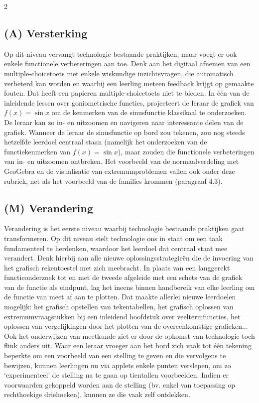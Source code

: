\begin{multicols}{2}
\subsection*{(A) Versterking}
Op dit niveau vervangt technologie bestaande praktijken, maar voegt er ook enkele functionele verbeteringen aan toe. Denk aan het digitaal afnemen van een multiple-choicetoets met enkele wiskundige inzichtsvragen, die automatisch verbeterd kan worden en waarbij een leerling meteen feedback krijgt op gemaakte fouten. Dat heeft een papieren multiple-choicetoets niet te bieden. In één van de inleidende lessen over goniometrische functies, projecteert de leraar de grafiek van $f(x)=\sin x$ om de kenmerken van de sinusfunctie klassikaal te onderzoeken. De leraar kan zo in- en uitzoomen en navigeren naar interessante delen van de grafiek. Wanneer de leraar de sinusfunctie op bord zou tekenen, zou nog steeds hetzelfde leerdoel centraal staan (namelijk het onderzoeken van de functiekenmerken van $f(x)=\sin x$), maar zouden die functionele verbeteringen van in- en uitzoomen ontbreken. Het voorbeeld van de normaalverdeling met GeoGebra en de visualisatie van extremumproblemen vallen ook onder deze rubriek, net als het voorbeeld van de families krommen (paragraaf 4.3).

\subsection*{(M) Verandering}
Verandering is het eerste niveau waarbij technologie bestaande praktijken gaat transformeren. Op dit niveau stelt technologie ons in staat om een taak fundamenteel te herdenken, waardoor het leerdoel dat centraal staat mee verandert. Denk hierbij aan alle nieuwe oplossingsstrategieën die de invoering van het grafisch rekentoestel met zich meebracht. In plaats van een langgerekt functieonderzoek tot en met de tweede afgeleide met een schets van de grafiek van de functie als eindpunt, lag het ineens binnen handbereik van elke leerling om de functie van meet af aan te plotten. Dat maakte allerlei nieuwe leerdoelen mogelijk: het grafisch opstellen van tekentabellen, het grafisch oplossen van extremumvraagstukken bij een inleidend hoofdstuk over veeltermfuncties, het oplossen van vergelijkingen door het plotten van de overeenkomstige grafieken... Ook het onderwijzen van meetkunde ziet er door de opkomst van technologie toch flink anders uit. Waar een leraar vroeger aan het bord zich vaak tot één tekening beperkte om een voorbeeld van een stelling te geven en die vervolgens te bewijzen, kunnen leerlingen nu via applets enkele punten verslepen, om zo `experimenteel' de stelling na te gaan op tientallen voorbeelden. Indien er voorwaarden gekoppeld worden aan de stelling (bv. enkel van toepassing op rechthoekige driehoeken), kunnen ze die vaak zelf ontdekken.


\end{multicols}
